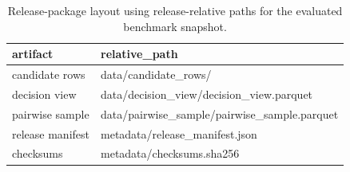 \begin{table}[t]
  \centering
  \footnotesize
  \caption{Release-package layout using release-relative paths for the evaluated benchmark snapshot.}
  \label{tab:artifact-layout}
  \begin{tabularx}{\columnwidth}{@{}P{0.31\columnwidth}L@{}}
    \toprule
    artifact & relative\_path \\
    \midrule
    candidate rows & data/candidate\_rows/ \\
    decision view & data/decision\_view/decision\_view.parquet \\
    pairwise sample & data/pairwise\_sample/pairwise\_sample.parquet \\
    release manifest & metadata/release\_manifest.json \\
    checksums & metadata/checksums.sha256 \\
    \bottomrule
  \end{tabularx}
\end{table}
